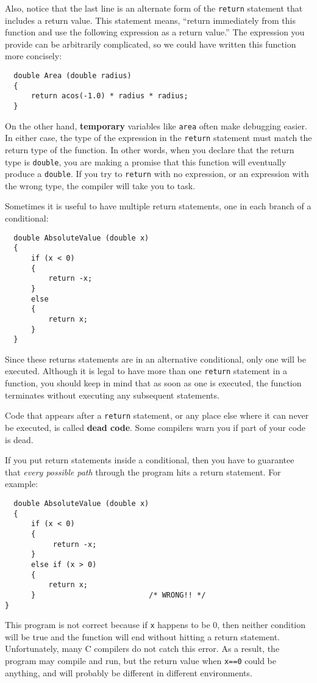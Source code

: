 Also, notice that the last line is an alternate form of the
{\tt return} statement that includes a return value.  This
statement means, ``return immediately from this function and
use the following expression as a return value.''  The
expression you provide can be arbitrarily complicated,
so we could have written this function more concisely:

\begin{verbatim}
  double Area (double radius) 
  {
      return acos(-1.0) * radius * radius;
  }
\end{verbatim}
%
On the other hand, {\bf temporary} variables like {\tt area} often
make debugging easier.  In either case, the type of the expression in
the {\tt return} statement must match the return type of the function.
In other words, when you declare that the return type is {\tt double},
you are making a promise that this function will eventually
produce a {\tt double}.  If you try to {\tt return} with no
expression, or an expression with the wrong type, the compiler will
take you to task.


Sometimes it is useful to have multiple return
statements, one in each branch of a conditional:

\begin{verbatim}
  double AbsoluteValue (double x) 
  {
      if (x < 0) 
      {
          return -x;
      } 
      else 
      {
          return x;
      }
  }
\end{verbatim}
%
Since these returns statements are in an alternative conditional, only
one will be executed.  Although it is legal to have more than one
{\tt return} statement in a function, you should keep in mind that as soon
as one is executed, the function terminates without executing any
subsequent statements.

Code that appears after a {\tt return} statement, or any place else
where it can never be executed, is called {\bf dead code}.  Some
compilers warn you if part of your code is dead.


If you put return statements inside a conditional, then
you have to guarantee that {\em every possible path} through
the program hits a return statement.  For example:

\begin{verbatim}
  double AbsoluteValue (double x) 
  {
      if (x < 0) 
      {
           return -x;
      } 
      else if (x > 0) 
      {
          return x;
      }                          /* WRONG!! */
}
\end{verbatim}
%
This program is not correct because if {\tt x} happens to be 0, then
neither condition will be true and the function will end without hitting
a return statement.  Unfortunately, many C compilers do not catch
this error.  As a result, the program may compile and run, but the
return value when {\tt x==0} could be anything, and will probably
be different in different environments.

